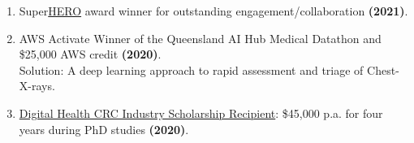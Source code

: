 \begin{enumerate}
	\item Super\href{https://healthequity.link/}{HERO} award winner for outstanding engagement/collaboration \hfill\textbf{(2021)}.
    \item AWS Activate Winner of the Queensland AI Hub Medical Datathon and \$25,000 AWS credit \hfill\textbf{(2020)}.\\
	Solution: A deep learning approach to rapid assessment and triage of Chest-X-rays.
	\item \href{https://www.credly.com/badges/ad81135e-f5a0-4f0f-beee-06144ec4d66e/public_url}{Digital Health CRC Industry Scholarship Recipient}: \$45,000 p.a. for four years during PhD studies \hfill\textbf{(2020)}.
\end{enumerate}\par